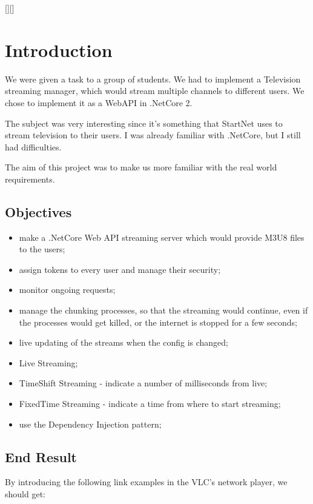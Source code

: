 \documentclass{article}
\begin{document}
	[][]

	\tableofcontents
	\newpage

	\pagestyle{fancy}
	\fancyhf{}

	\chead{}
	\fancyhead[L]{\leftmark}

	\section{Introduction}
		We were given a task to a group of students. We had to implement a Television streaming manager, which would stream multiple channels to different users. We chose to implement it as a WebAPI in .NetCore 2.
		
		The subject was very interesting since it's something that StartNet uses to stream television to their users.
		I was already familiar with .NetCore, but I still had difficulties.

		The aim of this project was to make us more familiar with the real world requirements.

		\subsection{Objectives}
			\begin{itemize}
				\item make a .NetCore Web API streaming server which would provide M3U8 files to the users;
				\item assign tokens to every user and manage their security;
				\item monitor ongoing requests;
				\item manage the chunking processes, so that the streaming would continue, even if the processes would get killed, or the internet is stopped for a few seconds;
				\item live updating of the streams when the config is changed;
				\item Live Streaming;
				\item TimeShift Streaming - indicate a number of milliseconds from live;
				\item FixedTime Streaming - indicate a time from where to start streaming;
				\item use the Dependency Injection pattern;
			\end{itemize}

		\subsection{End Result}
			By introducing the following link examples in the VLC's network player, we should get:
\end{document}
